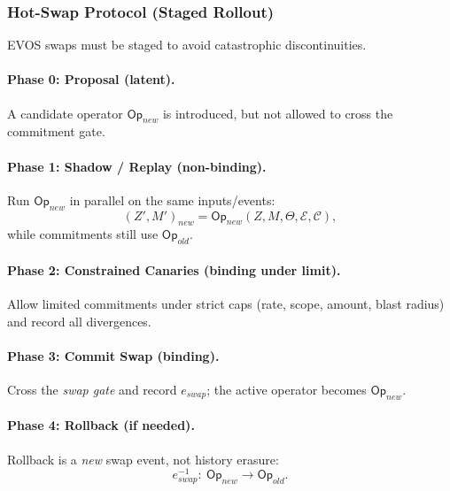 \documentclass[11pt]{article}
\begin{document}
\subsubsection{Hot-Swap Protocol (Staged Rollout)}
\label{sec:hot-swap-protocol}

EVOS swaps must be staged to avoid catastrophic discontinuities.

\paragraph{Phase 0: Proposal (latent).}
A candidate operator $\mathsf{Op}_{new}$ is introduced, but not allowed to cross the commitment gate.

\paragraph{Phase 1: Shadow / Replay (non-binding).}
Run $\mathsf{Op}_{new}$ in parallel on the same inputs/events:
\[
(Z',M')_{new} = \mathsf{Op}_{new}(Z,M,\Theta,\mathcal{E},\mathcal{C}),
\]
while commitments still use $\mathsf{Op}_{old}$.

\paragraph{Phase 2: Constrained Canaries (binding under limit).}
Allow limited commitments under strict caps (rate, scope, amount, blast radius) and record all divergences.

\paragraph{Phase 3: Commit Swap (binding).}
Cross the \emph{swap gate} and record $e_{swap}$; the active operator becomes $\mathsf{Op}_{new}$.

\paragraph{Phase 4: Rollback (if needed).}
Rollback is a \emph{new} swap event, not history erasure:
\[
e_{swap}^{-1}:\ \mathsf{Op}_{new}\rightarrow \mathsf{Op}_{old}.
\]
\end{document}

